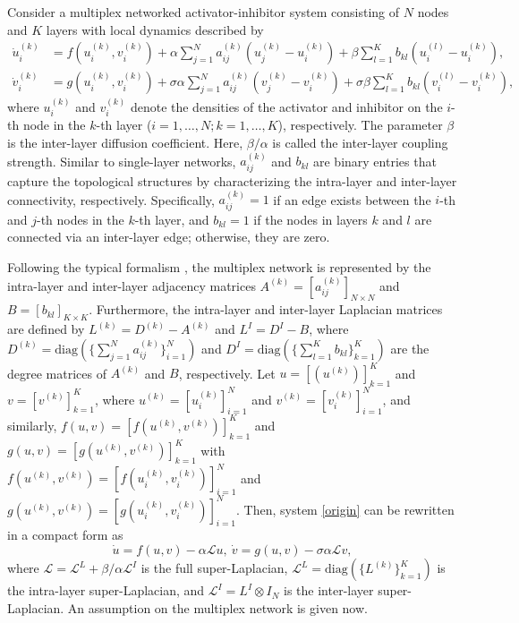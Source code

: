 \documentclass{SCIS2026}
\newcommand{\kk}{^{(k)}}
\newcommand{\dd}{\mathrm{diag}}
\newcommand{\ml}{\mathcal{L}}
\newcommand{\ik}{_{k=1}^{K}}
\newcommand{\inn}{_{i=1}^{N}}
\begin{document}
Consider a multiplex networked activator-inhibitor system consisting of $N$ nodes and $K$ layers with local dynamics described by
\begin{equation}\label{origin}
	\begin{aligned}
		\dot{u}_i\kk & = f(u_i\kk,v_i\kk) + \alpha\sum_{j=1}^N a\kk_{ij} (u_j\kk - u_i\kk) + \beta\sum_{l=1}^K b_{kl} (u_i^{(l)} - u_i\kk),             \\
		\dot{v}_i\kk & = g(u_i\kk,v_i\kk) + \sigma\alpha\sum_{j=1}^N a\kk_{ij} (v_j\kk - v_i\kk) + \sigma\beta\sum_{l=1}^K b_{kl} (v_i^{(l)} - v_i\kk),
	\end{aligned}
\end{equation}
where $u_i\kk$ and $v_i\kk$ denote the densities of the activator and inhibitor on the $i$-th node in the $k$-th layer ($i=1,\dots,N; k=1,\dots,K$), respectively.
The parameter $\beta$ is the inter-layer diffusion coefficient.
Here, $\beta / \alpha$ is called the inter-layer coupling strength.
Similar to single-layer networks, $a\kk_{ij}$ and $b_{kl}$ are binary entries that capture the topological structures by characterizing the intra-layer and inter-layer connectivity, respectively.
Specifically, $a\kk_{ij}=1$ if an edge exists between the $i$-th and $j$-th nodes in the $k$-th layer, and $b_{kl}=1$ if the nodes in layers $k$ and $l$ are connected via an inter-layer edge; otherwise, they are zero.

Following the typical formalism \cite{Sole2013}, the multiplex network is represented by the intra-layer and inter-layer adjacency matrices $A\kk = [a\kk_{ij}]_{N\times N}$ and $B = [b_{kl}]_{K\times K}$.
Furthermore, the intra-layer and inter-layer Laplacian matrices are defined by $L\kk = D\kk - A\kk$ and $L^I = D^I - B$, where $D\kk=\dd(\{\sum_{j=1}^N a\kk_{ij}\}\inn)$ and $D^I=\dd(\{\sum_{l=1}^K b_{kl}\}\ik)$ are the degree matrices of $A\kk$ and $B$, respectively.
Let $u=[(u^{(k)})]\ik$ and $v=[v^{(k)}]\ik$, where $u\kk = [u_i\kk]\inn$ and $v\kk = [v_i\kk]\inn$, and similarly, $f(u,v) = [f(u^{(k)}, v^{(k)})]\ik$ and $g(u,v) = [g(u^{(k)}, v^{(k)})]\ik$ with $f(u^{(k)}, v^{(k)}) = [f(u_i^{(k)}, v_i^{(k)})]\inn$ and $g(u^{(k)}, v^{(k)}) = [g(u_i^{(k)}, v_i^{(k)})]\inn$.
Then, system \eqref{origin} can be rewritten in a compact form as
\begin{equation*}
	\dot{u} = f(u,v) - \alpha \ml u, ~ \dot{v} = g(u,v) - \sigma \alpha \ml v,
\end{equation*}
where $\ml =  \ml^L + \beta / \alpha \ml^I$ is the full super-Laplacian, $\ml^L = \dd(\{L^{(k)}\}\ik)$ is the intra-layer super-Laplacian, and $\ml^I = L^I \otimes I_N$ is the inter-layer super-Laplacian.
An assumption on the multiplex network is given now.
\end{document}

